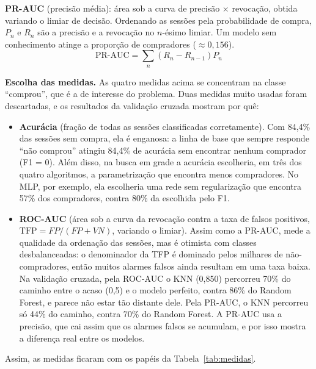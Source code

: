 \documentclass[11pt,a4paper]{article}
\begin{document}
\textbf{PR-AUC} (precisão média): área sob a curva de precisão $\times$ revocação, obtida variando o limiar de
decisão. Ordenando as sessões pela probabilidade de compra, $P_n$ e $R_n$ são a precisão e a revocação no $n$-ésimo
limiar. Um modelo sem conhecimento atinge a proporção de compradores ($\approx 0{,}156$).
\begin{equation*}
  \text{PR-AUC} = \sum_{n} \left(R_n - R_{n-1}\right) P_n
\end{equation*}

\textbf{Escolha das medidas.} As quatro medidas acima se concentram na classe ``comprou'', que é a de interesse do
problema. Duas medidas muito usadas foram descartadas, e os resultados da validação cruzada mostram por quê:
\begin{itemize}
  \item \textbf{Acurácia} (fração de todas as sessões classificadas corretamente). Com 84,4\% das sessões sem compra,
        ela é enganosa: a linha de base que sempre responde ``não comprou'' atingiu 84,4\% de acurácia sem encontrar
        nenhum comprador (F1 = 0). Além disso, na busca em grade a acurácia escolheria, em três dos quatro algoritmos,
        a parametrização que encontra menos compradores. No MLP, por exemplo, ela escolheria uma rede sem
        regularização que encontra 57\% dos compradores, contra 80\% da escolhida pelo F1.
  \item \textbf{ROC-AUC} (área sob a curva da revocação contra a taxa de falsos positivos,
        $\text{TFP} = FP/(FP + VN)$, variando o limiar). Assim como a PR-AUC, mede a qualidade da ordenação das
        sessões, mas é otimista com classes desbalanceadas: o denominador da TFP é dominado pelos milhares de
        não-compradores, então muitos alarmes falsos ainda resultam em uma taxa baixa. Na validação cruzada, pela
        ROC-AUC o KNN (0,850) percorreu 70\% do caminho entre o acaso (0,5) e o modelo perfeito, contra 86\% do Random
        Forest, e parece não estar tão distante dele. Pela PR-AUC, o KNN percorreu só 44\% do caminho, contra 70\% do
        Random Forest. A PR-AUC usa a precisão, que cai assim que os alarmes falsos se acumulam, e por isso mostra a
        diferença real entre os modelos.
\end{itemize}
Assim, as medidas ficaram com os papéis da Tabela~\ref{tab:medidas}.
\end{document}
